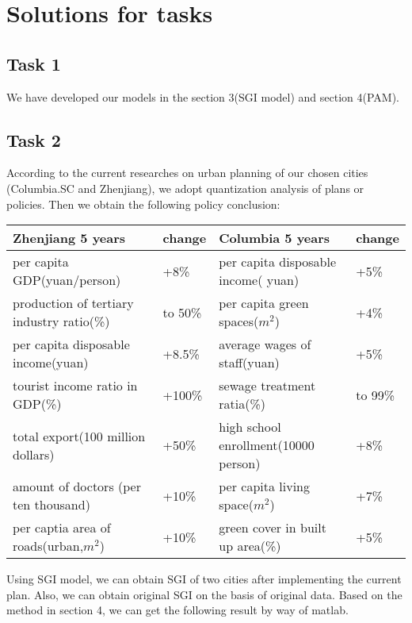 \documentclass{mcmthesis}
\begin{document}
\section{Solutions for tasks }
\subsection{Task 1}%
We have developed our models in the section 3(SGI model) and section 4(PAM).\\
\subsection{Task 2}%
According to the current researches on urban planning of our chosen cities (Columbia.SC and Zhenjiang), we adopt quantization analysis of plans or policies. Then we obtain the following policy conclusion:\\
\begin{table}[h]

\centering
{}
\begin{tabular}{p{5.2cm}|p{1.2cm}|p{5.2cm}|p{1.2cm}}
\hline
\bf Zhenjiang 5 years	 & \bf change	 & \bf Columbia 5 years	& \bf change \\
\hline
 per capita GDP(yuan/person)	& +8\%	& per capita disposable income( yuan)	& +5\% \\
production of tertiary industry ratio(\%)	& to 50\%	& per capita green spaces($m^2$)	& +4\% \\
per capita disposable income(yuan)	& +8.5\%	& average wages of staff(yuan)	& +5\% \\
tourist income ratio in GDP(\%)	& +100\%	& sewage treatment ratia(\%)	& to 99\% \\
total export(100 million dollars)	& +50\%	& high school enrollment(10000 person)	& +8\% \\
amount of doctors (per ten thousand)	& +10\%	& per capita living space($m^2$)	& +7\% \\
per captia area of roads(urban,$m^2$)	& +10\%	& green cover in built up area(\%)	& +5\% \\
\hline
\end{tabular}
\end{table}

\noindent Using SGI model, we can obtain SGI of two cities after implementing the current plan. Also, we can obtain original SGI on the basis of original data. Based on the method in section 4, we can get the following result by way of matlab.\\
\end{document}

